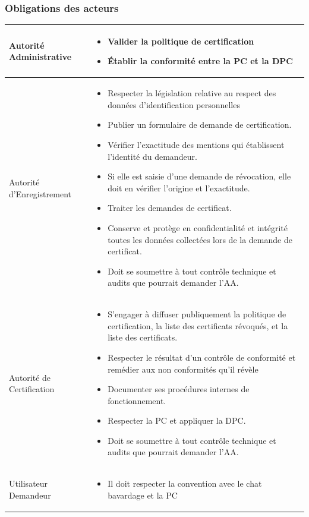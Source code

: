 \documentclass[a4paper,11pt,french]{book}
\begin{document}
\subsubsection{Obligations des acteurs}
\begin{tabular}{|l|p{10cm}|}
  \hline
  Autorité Administrative &  
  \begin{itemize}
   \item Valider la politique de certification
   \item Établir la conformité entre la PC et la DPC
   \end{itemize}

 \\
  \hline
  Autorité d'Enregistrement & 
  \begin{itemize}
  \item  Respecter la législation relative au respect des données
d’identification personnelles
\item Publier un formulaire de demande de certification.
\item Vérifier l'exactitude des mentions qui établissent l'identité du
demandeur.
\item Si elle est saisie d'une demande de révocation, elle doit en vérifier l'origine et l'exactitude.
\item Traiter les demandes de certificat.
\item Conserve et protège en confidentialité et intégrité toutes les données collectées lors de la demande de certificat.
\item Doit se soumettre à tout contrôle technique et audits que pourrait demander l'AA.
  \end{itemize}
  \\
  \hline
  Autorité de Certification &
  \begin{itemize}

\item S'engager à diffuser publiquement la politique de certification, la liste des certificats révoqués, et la liste des certificats.
\item Respecter le résultat d’un contrôle de conformité et remédier aux non conformités qu’il révèle
\item Documenter ses procédures internes de fonctionnement.
\item Respecter la PC et appliquer la DPC.
\item Doit se soumettre à tout contrôle technique et audits que pourrait demander l'AA.

  \end{itemize}
 \\
 \hline
 Utilisateur Demandeur &
 \begin{itemize}
 \item Il doit respecter la convention avec le chat bavardage et la PC


\end{itemize}
\end{tabular}
\end{document}
